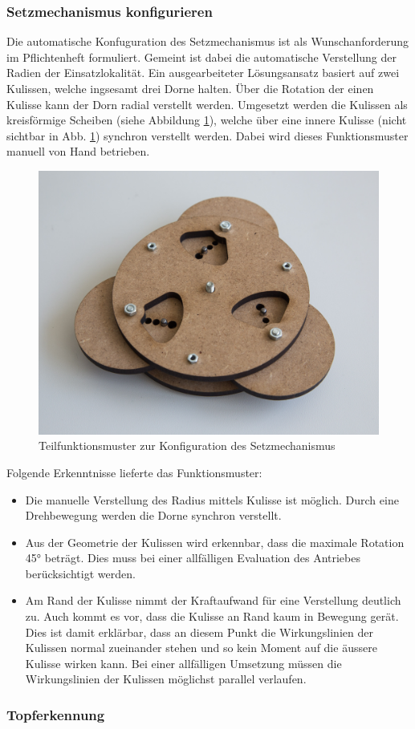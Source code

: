 \subsubsection{Setzmechanismus konfigurieren}
Die automatische Konfuguration des Setzmechanismus ist als Wunschanforderung im Pflichtenheft formuliert. Gemeint ist dabei die automatische Verstellung der Radien der Einsatzlokalität. Ein ausgearbeiteter Lösungsansatz basiert auf zwei Kulissen, welche ingsesamt drei Dorne halten. Über die Rotation der einen Kulisse kann der Dorn radial verstellt werden. Umgesetzt werden die Kulissen als kreisförmige Scheiben (siehe Abbildung \ref{fig:setzmech_konfig}), welche über eine innere Kulisse (nicht sichtbar in Abb. \ref{fig:setzmech_konfig}) synchron verstellt werden. Dabei wird dieses Funktionsmuster manuell von Hand betrieben.
\begin{figure}[H]
	\includegraphics[width=1\textwidth]{Illustrationen/5-Konzept/setzmech_konfig.jpg}
	\caption{Teilfunktionsmuster zur Konfiguration des Setzmechanismus}
	\label{fig:setzmech_konfig}
\end{figure}
Folgende Erkenntnisse lieferte das Funktionsmuster:
\begin{itemize}
	\item Die manuelle Verstellung des Radius mittels Kulisse ist möglich. Durch eine Drehbewegung werden die Dorne synchron verstellt.
	
	\item Aus der Geometrie der Kulissen wird erkennbar, dass die maximale Rotation 45° beträgt. Dies muss bei einer allfälligen Evaluation des Antriebes berücksichtigt werden.
	
	\item Am Rand der Kulisse nimmt der Kraftaufwand für eine Verstellung deutlich zu. Auch kommt es vor, dass die Kulisse an Rand kaum in Bewegung gerät. Dies ist damit erklärbar, dass an diesem Punkt die Wirkungslinien der Kulissen normal zueinander stehen und so kein Moment auf die äussere Kulisse wirken kann. Bei einer allfälligen Umsetzung müssen die Wirkungslinien der Kulissen möglichst parallel verlaufen. 
\end{itemize} 
\subsubsection{Topferkennung}